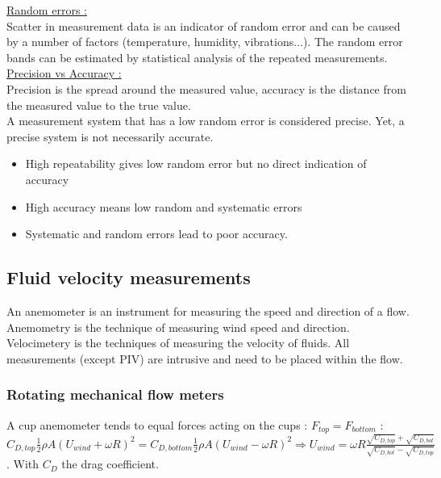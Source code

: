 \documentclass[../main.tex]{subfiles}
\begin{document}
\quad \underline{Random errors :}\\
Scatter in measurement data is an indicator of random error and can be caused by a number of factors (temperature, humidity, vibrations...). The random error bands can be estimated by statistical analysis of the repeated measurements.\\

\quad \underline{Precision vs Accuracy :}\\

Precision is the spread around the measured value, accuracy is the distance from the measured value to the true value.\\

A measurement system that has a low random error is considered precise. Yet, a precise system is not necessarily accurate.\\

\begin{itemize}
    \item High repeatability gives low random error but no direct indication of accuracy\\
    \item High accuracy means low random and systematic errors\\
    \item Systematic and random errors lead to poor accuracy.\\
\end{itemize}


\subsection{Fluid velocity measurements}
An anemometer is an instrument for measuring the speed and direction of a flow. Anemometry is the technique of measuring wind speed and direction. Velocimetery is the techniques of measuring the velocity of fluids.
All measurements (except PIV) are intrusive and need to be placed within the flow.

\subsubsection{Rotating mechanical flow meters}
A cup anemometer tends to equal forces acting on the cups : $F_{top} = F_{bottom}$ : $C_{D,top} \frac{1}{2} \rho A (U_{wind} + \omega R)^2 = C_{D,bottom} \frac{1}{2} \rho A (U_{wind} - \omega R)^2 \Rightarrow U_{wind} = \omega R \frac{\sqrt{C_{D,top}} + \sqrt{C_{D,bot}}}{\sqrt{C_{D,bot}} - \sqrt{C_{D,top}}}$.
With $C_D$ the drag coefficient.\\
\end{document}
